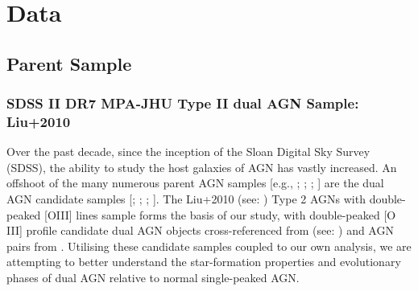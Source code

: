 \section{Data}
\subsection{Parent Sample}

\subsubsection{SDSS II DR7 MPA-JHU Type II dual AGN Sample: Liu+2010}

Over the past decade, since the inception of the Sloan Digital Sky Survey (SDSS), the ability to study the host galaxies of AGN has vastly increased. An offshoot of the many numerous parent AGN samples [e.g., \cite{Zakamska2003}; \cite{Kewley_2006}; \cite{Stasinska_2006}; \cite{Wild_2010}] are the dual AGN candidate samples [\cite{Smith_2010}; \cite{Liu_2012}; \cite{Ge_Hu_Wang_Bai_Zhang_2012}; \cite{2012ApJ...753...42C}]. The Liu+2010 (see: \cite{Liu_2009}) Type 2 AGNs with double-peaked [OIII] lines sample forms the basis of our study, with double-peaked [O III] profile candidate dual AGN objects cross-referenced from (see: \cite{Ge_Hu_Wang_Bai_Zhang_2012}) and AGN pairs from \cite{Liu_2012}. Utilising these candidate samples coupled to our own analysis, we are attempting to better understand the star-formation properties and evolutionary phases of dual AGN relative to normal single-peaked AGN.

